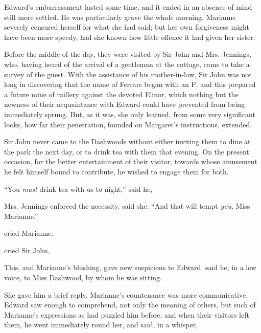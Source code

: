 Edward's embarrassment lasted some time, and it ended in an absence of mind still more settled. He was particularly grave the whole morning. Marianne severely censured herself for what she had said; but her own forgiveness might have been more speedy, had she known how little offence it had given her sister.

Before the middle of the day, they were visited by Sir John and Mrs. Jennings, who, having heard of the arrival of a gentleman at the cottage, came to take a survey of the guest. With the assistance of his mother-in-law, Sir John was not long in discovering that the name of Ferrars began with an F. and this prepared a future mine of raillery against the devoted Elinor, which nothing but the newness of their acquaintance with Edward could have prevented from being immediately sprung. But, as it was, she only learned, from some very significant looks, how far their penetration, founded on Margaret's instructions, extended.

Sir John never came to the Dashwoods without either inviting them to dine at the park the next day, or to drink tea with them that evening. On the present occasion, for the better entertainment of their visitor, towards whose amusement he felt himself bound to contribute, he wished to engage them for both.

“You {\em must} drink tea with us to night,” said he, 

Mrs. Jennings enforced the necessity.  said she. “And that will tempt {\em you}, Miss Marianne.”

 cried Marianne. 


 cried Sir John, 

This, and Marianne's blushing, gave new suspicions to Edward.  said he, in a low voice, to Miss Dashwood, by whom he was sitting.

She gave him a brief reply. Marianne's countenance was more communicative. Edward saw enough to comprehend, not only the meaning of others, but such of Marianne's expressions as had puzzled him before; and when their visitors left them, he went immediately round her, and said, in a whisper, 

